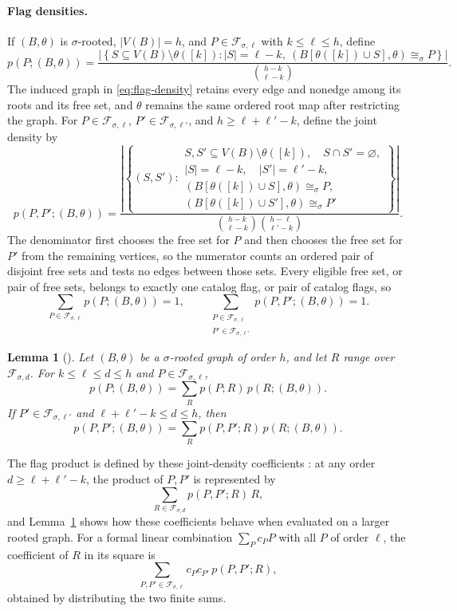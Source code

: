 \documentclass[11pt]{article}
\newtheorem{lemma}{Lemma}
\begin{document}
\paragraph{Flag densities.}
If $(B,\theta)$ is $\sigma$-rooted, $|V(B)|=h$, and $P\in\mathcal F_{\sigma,\ell}$ with $k\leq\ell\leq h$, define
\begin{equation}\label{eq:flag-density}
p(P;(B,\theta))=
\frac{\left|\left\{S\subseteq V(B)\setminus\theta([k]):
|S|=\ell-k,\ 
(B[\theta([k])\cup S],\theta)\cong_\sigma P
\right\}\right|}
{\binom{h-k}{\ell-k}}.
\end{equation}
The induced graph in \eqref{eq:flag-density} retains every edge and nonedge among its roots and its free set, and $\theta$ remains the same ordered root map after restricting the graph.
For $P\in\mathcal F_{\sigma,\ell}$, $P'\in\mathcal F_{\sigma,\ell'}$, and $h\geq\ell+\ell'-k$, define the joint density by
\begin{equation}\label{eq:joint-flag-density}
p(P,P';(B,\theta))=
\frac{\displaystyle\left|\left\{(S,S'):
\begin{array}{l}
S,S'\subseteq V(B)\setminus\theta([k]),\quad S\cap S'=\varnothing,\\
|S|=\ell-k,\quad |S'|=\ell'-k,\\
(B[\theta([k])\cup S],\theta)\cong_\sigma P,\\
(B[\theta([k])\cup S'],\theta)\cong_\sigma P'
\end{array}\right\}\right|}
{\displaystyle\binom{h-k}{\ell-k}\binom{h-\ell}{\ell'-k}}.
\end{equation}
The denominator first chooses the free set for $P$ and then chooses the free set for $P'$ from the remaining vertices, so the numerator counts an ordered pair of disjoint free sets and tests no edges between those sets.
Every eligible free set, or pair of free sets, belongs to exactly one catalog flag, or pair of catalog flags, so
\[
\sum_{P\in\mathcal F_{\sigma,\ell}}p(P;(B,\theta))=1,
\qquad
\sum_{\substack{P\in\mathcal F_{\sigma,\ell}\\P'\in\mathcal F_{\sigma,\ell'}}}
p(P,P';(B,\theta))=1.
\]
\begin{lemma}[{\cite[Lemma~2.2]{Razborov}}]\label{lem:flag-chain}
Let $(B,\theta)$ be a $\sigma$-rooted graph of order $h$, and let $R$ range over $\mathcal F_{\sigma,d}$.
For $k\leq\ell\leq d\leq h$ and $P\in\mathcal F_{\sigma,\ell}$,
\[
p(P;(B,\theta))=\sum_Rp(P;R)\,p(R;(B,\theta)).
\]
If $P'\in\mathcal F_{\sigma,\ell'}$ and $\ell+\ell'-k\leq d\leq h$, then
\[
p(P,P';(B,\theta))
=\sum_Rp(P,P';R)\,p(R;(B,\theta)).
\]
\end{lemma}
The flag product is defined by these joint-density coefficients
\cite[equation~(5) and Lemma~2.4]{Razborov}: at any order $d\geq\ell+\ell'-k$, the product of $P,P'$ is represented by
\[
\sum_{R\in\mathcal F_{\sigma,d}}p(P,P';R)\,R,
\]
and Lemma~\ref{lem:flag-chain} shows how these coefficients behave when evaluated on a larger rooted graph.
For a formal linear combination $\sum_Pc_PP$ with all $P$ of order $\ell$, the coefficient of $R$ in its square is
\[
\sum_{P,P'\in\mathcal F_{\sigma,\ell}}c_Pc_{P'}\,p(P,P';R),
\]
obtained by distributing the two finite sums.
\end{document}
